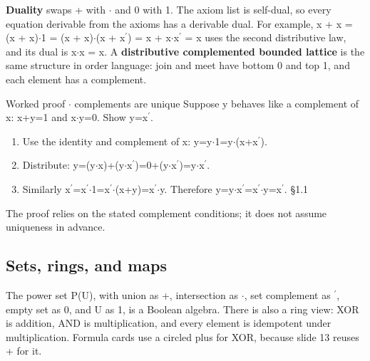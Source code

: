 \documentclass[11pt]{article}
\begin{document}
\begin{keepsection}
\begin{keepsection}
\textbf{Duality} swaps + with \ensuremath{\cdot} and 0 with 1. The axiom list is self-dual, so every equation derivable from the axioms has a derivable dual. For example, x + x = (x + x)\ensuremath{\cdot}1 = (x + x)\ensuremath{\cdot}(x + x\ensuremath{{}^{\prime}}) = x + x\ensuremath{\cdot}x\ensuremath{{}^{\prime}} = x uses the second distributive law, and its dual is x\ensuremath{\cdot}x = x. A \textbf{distributive complemented bounded lattice} is the same structure in order language: join and meet have bottom 0 and top 1, and each element has a complement.

\begin{workedbox}{Worked proof \ensuremath{\cdot} complements are unique}
Suppose y behaves like a complement of x: x+y=1 and x\ensuremath{\cdot}y=0. Show y=x\ensuremath{{}^{\prime}}.

\begin{enumerate}
\item Use the identity and complement of x: y=y\ensuremath{\cdot}1=y\ensuremath{\cdot}(x+x\ensuremath{{}^{\prime}}).
\item Distribute: y=(y\ensuremath{\cdot}x)+(y\ensuremath{\cdot}x\ensuremath{{}^{\prime}})=0+(y\ensuremath{\cdot}x\ensuremath{{}^{\prime}})=y\ensuremath{\cdot}x\ensuremath{{}^{\prime}}.
\item Similarly x\ensuremath{{}^{\prime}}=x\ensuremath{{}^{\prime}}\ensuremath{\cdot}1=x\ensuremath{{}^{\prime}}\ensuremath{\cdot}(x+y)=x\ensuremath{{}^{\prime}}\ensuremath{\cdot}y. Therefore y=y\ensuremath{\cdot}x\ensuremath{{}^{\prime}}=x\ensuremath{{}^{\prime}}\ensuremath{\cdot}y=x\ensuremath{{}^{\prime}}. \hfill{\small\color{FAUblue}§1.1}
\end{enumerate}

The proof relies on the stated complement conditions; it does not assume uniqueness in advance.
\end{workedbox}
\end{keepsection}

\begin{keepsection}
\subsection{Sets, rings, and maps}

The power set P(U), with union as +, intersection as \ensuremath{\cdot}, set complement as \ensuremath{{}^{\prime}}, empty set as 0, and U as 1, is a Boolean algebra. There is also a ring view: XOR is addition, AND is multiplication, and every element is idempotent under multiplication. Formula cards use a circled plus for XOR, because slide 13 reuses + for it.


\end{keepsection}
\end{keepsection}
\end{document}
